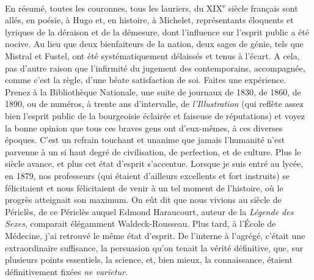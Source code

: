 \documentclass[french,twoside]{book} %
\begin{document}
En résumé, toutes les couronnes, tous les lauriers, du XIX\textsuperscript{e} siècle français sont allés, en poésie, à Hugo et, en histoire, à Michelet, représentants éloquents et lyriques de la déraison et de la démesure, dont l’influence sur l’esprit public a été nocive. Au lieu que deux bienfaiteurs de la nation, deux sages de génie, tels que Mistral et Fustel, ont été systématiquement délaissés et tenus à l’écart. A cela, pas d’autre raison que l’infirmité du jugement des contemporains, accompagnée, comme c’est la règle, d’une béate satisfaction de soi. Faites une expérience. Prenez à la Bibliothèque Nationale, une suite de journaux de 1830, de 1860, de 1890, ou de numéros, à trente ans d’intervalle, de {\itshape l’Illustration} (qui reflète assez bien l’esprit public de la bourgeoisie éclairée et faiseuse de réputations) et voyez la bonne opinion que tous ces braves gens ont d’eux-mêmes, à ces diverses époques. C’est un refrain touchant et unanime que jamais l’humanité n’est parvenue à un si haut degré de civilisation, de perfection, et de culture. Plus le siècle avance, et plus cet état d’esprit s’accentue. Lorsque je suis entré au lycée, en 1879, nos professeurs (qui étaient d’ailleurs excellents et fort instruits) se félicitaient et nous félicitaient de venir à un tel moment de l’histoire, où le progrès atteignait son maximum. On eût dit que nous vivions au siècle de Périclès, de ce Périclès auquel Edmond Haraucourt, auteur de la {\itshape Légende des Sexes}, comparait élégamment Waldeck-Rousseau. Plus tard, à l’École de Médecine, j’ai retrouvé le même état d’esprit. De l’interne à l’agrégé, c’était une extraordinaire suffisance, la persuasion qu’on tenait la vérité définitive, que, sur plusieurs points essentiels, la science, et, bien mieux, la connaissance, étaient définitivement fixées {\itshape ne varietur.}\par
\end{document}
